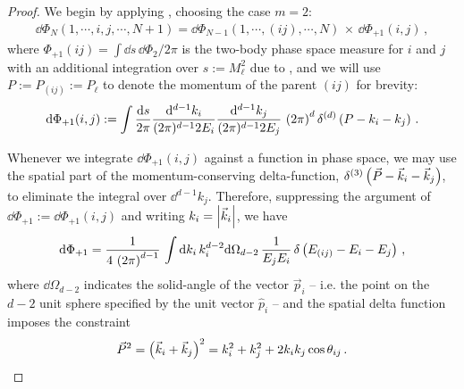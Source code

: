 \begin{proof}
    We begin by applying , choosing the case \(m=2\):
    \begin{align}
        \dd \Phi_{N}(1, \cdots, i, j, \cdots, N+1)
        =
        \dd \Phi_{N-1}(1, \cdots, (ij), \cdots, N)
        \,
        \times
        \,
        \dd\Phi_{+1}(i,j)
        \,,
    \end{align}
    where \(\Phi_{+1}(ij) = \int \dd s \, \dd \Phi_2 / 2\pi\) is the two-body phase space measure for \(i\) and \(j\) with an additional integration over \(s := M_\ell^2\) due to , and we will use \(P := P_{(ij)} := P_\ell\) to denote the momentum of the parent \((ij)\) for brevity:
    \begin{align}
        \dd \Phi_{+1}(i,j)
        :=
        \int \frac{\dd s}{2\pi}
        \frac{\dd^{d-1} k_i}{(2\pi)^{d-1} 2 E_i}
        \frac{\dd^{d-1} k_j}{(2\pi)^{d-1} 2 E_j}
        \,
        \left(2\pi\right)^d \delta^{(d)}\left(P - k_i - k_j\right)
        \,.
    \end{align}


    Whenever we integrate \(\dd \Phi_{+1}(i, j)\) against a function in phase space, we may use the spatial part of the momentum-conserving delta-function, \(\delta^{(3)}\left(\vec{P} - \vec{k}_i - \vec{k}_j\right)\), to eliminate the integral over \(\dd^{d-1} k_j\).
    Therefore, suppressing the argument of \(\dd \Phi_{+1} := \dd \Phi_{+1}(i, j)\) and writing \(k_i = \abs{\vec{k}_i}\), we have
    \begin{align}
        \dd \Phi_{+1}
        =
        \frac{1}{4\,\left(2\pi\right)^{d-1}}
        \,
        \int
        \dd k_i \, k_i^{d-2} \dd\Omega_{d-2}
        \,
        \frac{1}{E_j E_i}
        \,
        \delta\left(E_{(ij)} - E_i - E_j\right)
        \,,
    \end{align}
    where \(\dd \Omega_{d-2}\) indicates the solid-angle of the vector \(\vec{p}_i\) -- i.e. the point on the \(d-2\) unit sphere specified by the unit vector \(\hat{p}_i\) -- and the spatial delta function imposes the constraint
    \begin{align}
        \vec{P}^2 = \left(\vec{k}_i + \vec{k}_j\right)^2
        =
        k_i^2 + k_j^2 + 2 k_i k_j \cos\theta_{ij}
        \,.
    \end{align}


\end{proof}
